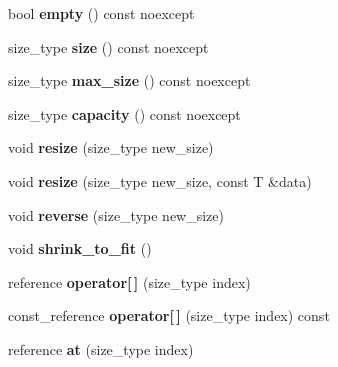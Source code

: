 \begin{DoxyCompactItemize}
bool {\bfseries empty} () const noexcept
\item 
\mbox{\label{classsc2d_1_1vec_aac87428778f8596670f97f3b3e6c38cb}} 
size\+\_\+type {\bfseries size} () const noexcept
\item 
\mbox{\label{classsc2d_1_1vec_a178f50e8a6c0df98e755b2ecea890e56}} 
size\+\_\+type {\bfseries max\+\_\+size} () const noexcept
\item 
\mbox{\label{classsc2d_1_1vec_aeb1b9e68ab05c7c9127cf966edbf66b9}} 
size\+\_\+type {\bfseries capacity} () const noexcept
\item 
\mbox{\label{classsc2d_1_1vec_a2003dfac46df0dfc2bc03a698a32d6ef}} 
void {\bfseries resize} (size\+\_\+type new\+\_\+size)
\item 
\mbox{\label{classsc2d_1_1vec_a3d1f93fd89be61cebd141a9263f6b07f}} 
void {\bfseries resize} (size\+\_\+type new\+\_\+size, const T \&data)
\item 
\mbox{\label{classsc2d_1_1vec_a899b4e56c49c62563ce84916d7e6257d}} 
void {\bfseries reverse} (size\+\_\+type new\+\_\+size)
\item 
\mbox{\label{classsc2d_1_1vec_a996dd3cdba84ae7a763b9a93055d2bdf}} 
void {\bfseries shrink\+\_\+to\+\_\+fit} ()
\item 
\mbox{\label{classsc2d_1_1vec_a0d395697c7d00a0f27082bf03bbbbc44}} 
reference {\bfseries operator\mbox{[}$\,$\mbox{]}} (size\+\_\+type index)
\item 
\mbox{\label{classsc2d_1_1vec_afb4bd9bba8dc46d5ada84262e0d78da3}} 
const\+\_\+reference {\bfseries operator\mbox{[}$\,$\mbox{]}} (size\+\_\+type index) const
\item 
\mbox{\label{classsc2d_1_1vec_a99d379f5618838a334a8307faaa07e65}} 
reference {\bfseries at} (size\+\_\+type index)
\item 
\mbox{\label{classsc2d_1_1vec_a4a5aa1823d60a97d8d28d0c609c9ac27}} 

\end{DoxyCompactItemize}
